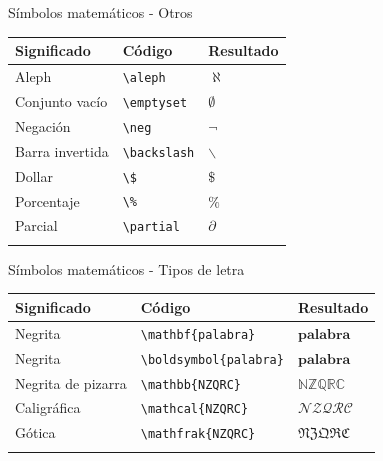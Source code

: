\documentclass[
  ignorenonframetext,
  aspectratio=169]{beamer}
\begin{document}
\begin{frame}[fragile]{Símbolos matemáticos - Otros}
\label{suxedmbolos-matemuxe1ticos---otros-1}
\begin{longtable}[]{@{}lll@{}}
\toprule\noalign{}
Significado & Código & Resultado \\
\midrule\noalign{}
\endhead
Aleph & \texttt{\textbackslash{}aleph} & \(\aleph\) \\
Conjunto vacío & \texttt{\textbackslash{}emptyset} & \(\emptyset\) \\
Negación & \texttt{\textbackslash{}neg} & \(\neg\) \\
Barra invertida & \texttt{\textbackslash{}backslash} & \(\backslash\) \\
Dollar & \texttt{\textbackslash{}\$} & \(\$\) \\
Porcentaje & \texttt{\textbackslash{}\%} & \(\%\) \\
Parcial & \texttt{\textbackslash{}partial} & \(\partial\) \\
\bottomrule\noalign{}
\end{longtable}
\end{frame}

\begin{frame}[fragile]{Símbolos matemáticos - Tipos de letra}
\label{suxedmbolos-matemuxe1ticos---tipos-de-letra}
\begin{longtable}[]{@{}lll@{}}
\toprule\noalign{}
Significado & Código & Resultado \\
\midrule\noalign{}
\endhead
Negrita & \texttt{\textbackslash{}mathbf\{palabra\}} &
\(\mathbf{palabra}\) \\
Negrita & \texttt{\textbackslash{}boldsymbol\{palabra\}} &
\(\boldsymbol{palabra}\) \\
Negrita de pizarra & \texttt{\textbackslash{}mathbb\{NZQRC\}} &
\(\mathbb{NZQRC}\) \\
Caligráfica & \texttt{\textbackslash{}mathcal\{NZQRC\}} &
\(\mathcal{NZQRC}\) \\
Gótica & \texttt{\textbackslash{}mathfrak\{NZQRC\}} &
\(\mathfrak{NZQRC}\) \\
\bottomrule\noalign{}
\end{longtable}
\end{frame}
\end{document}
